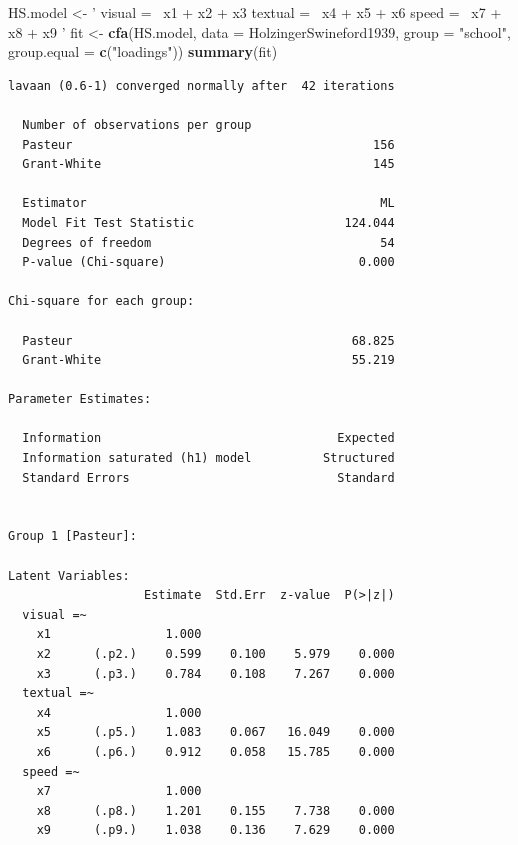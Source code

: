 \documentclass[
]{book}
\newenvironment{Shaded}{\begin{snugshade}}{\end{snugshade}}
\newcommand{\DataTypeTok}[1]{\textcolor[rgb]{0.13,0.29,0.53}{#1}}
\newcommand{\KeywordTok}[1]{\textcolor[rgb]{0.13,0.29,0.53}{\textbf{#1}}}
\newcommand{\NormalTok}[1]{#1}
\newcommand{\StringTok}[1]{\textcolor[rgb]{0.31,0.60,0.02}{#1}}
\begin{document}
\begin{Shaded}
\begin{Highlighting}[]
\NormalTok{HS.model <-}\StringTok{ '  visual =~ x1 + x2 + x3}
\StringTok{              textual =~ x4 + x5 + x6}
\StringTok{              speed   =~ x7 + x8 + x9 '}
\NormalTok{fit <-}\StringTok{ }\KeywordTok{cfa}\NormalTok{(HS.model, }
           \DataTypeTok{data =}\NormalTok{ HolzingerSwineford1939, }
           \DataTypeTok{group =} \StringTok{"school"}\NormalTok{,}
           \DataTypeTok{group.equal =} \KeywordTok{c}\NormalTok{(}\StringTok{"loadings"}\NormalTok{))}
\KeywordTok{summary}\NormalTok{(fit)}
\end{Highlighting}
\end{Shaded}

\begin{verbatim}
lavaan (0.6-1) converged normally after  42 iterations

  Number of observations per group         
  Pasteur                                          156
  Grant-White                                      145

  Estimator                                         ML
  Model Fit Test Statistic                     124.044
  Degrees of freedom                                54
  P-value (Chi-square)                           0.000

Chi-square for each group:

  Pasteur                                       68.825
  Grant-White                                   55.219

Parameter Estimates:

  Information                                 Expected
  Information saturated (h1) model          Structured
  Standard Errors                             Standard


Group 1 [Pasteur]:

Latent Variables:
                   Estimate  Std.Err  z-value  P(>|z|)
  visual =~                                           
    x1                1.000                           
    x2      (.p2.)    0.599    0.100    5.979    0.000
    x3      (.p3.)    0.784    0.108    7.267    0.000
  textual =~                                          
    x4                1.000                           
    x5      (.p5.)    1.083    0.067   16.049    0.000
    x6      (.p6.)    0.912    0.058   15.785    0.000
  speed =~                                            
    x7                1.000                           
    x8      (.p8.)    1.201    0.155    7.738    0.000
    x9      (.p9.)    1.038    0.136    7.629    0.000


\end{verbatim}
\end{document}
